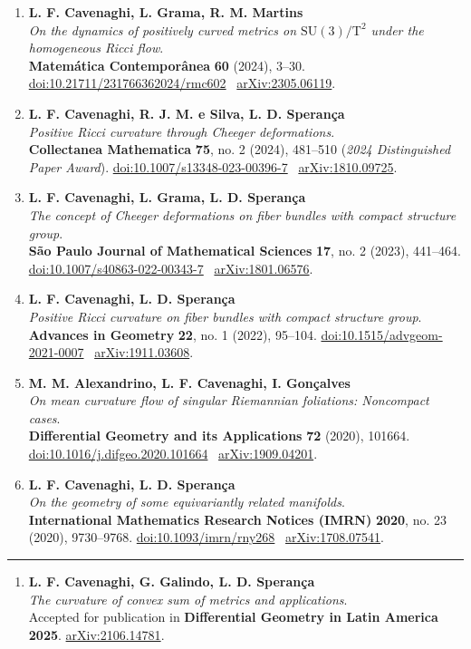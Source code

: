 \documentclass[10pt,a4paper]{article}
\newcommand{\sect}[1]{\vspace{10pt}{\large\bfseries\color{accent}#1}\par\vspace{2pt}\hrule\vspace{5pt}}
\newcommand{\paper}[3]{\Needspace{4\baselineskip}\item \textbf{#1}\\[-1pt]\emph{#2}.\\[-1pt]{\small #3}}
\begin{document}
\begin{enumerate}[leftmargin=2.0em,label=\textcolor{accent}{\arabic*.},labelsep=.65em,itemsep=5pt,topsep=4pt,parsep=0pt]
\paper{L. F. Cavenaghi, L. Grama, R. M. Martins}{On the dynamics of positively curved metrics on $\mathrm{SU}(3)/\mathrm{T}^2$ under the homogeneous Ricci flow}{\textbf{Matem\'atica Contempor\^anea} \textbf{60} (2024), 3--30. \href{https://doi.org/10.21711/231766362024/rmc602}{doi:10.21711/231766362024/rmc602} \textbar\ \href{https://arxiv.org/abs/2305.06119}{arXiv:2305.06119}.}
\paper{L. F. Cavenaghi, R. J. M. e Silva, L. D. Speran\c{c}a}{Positive Ricci curvature through Cheeger deformations}{\textbf{Collectanea Mathematica} \textbf{75}, no. 2 (2024), 481--510 (\emph{2024 Distinguished Paper Award}). \href{https://doi.org/10.1007/s13348-023-00396-7}{doi:10.1007/s13348-023-00396-7} \textbar\ \href{https://arxiv.org/abs/1810.09725}{arXiv:1810.09725}.}
\paper{L. F. Cavenaghi, L. Grama, L. D. Speran\c{c}a}{The concept of Cheeger deformations on fiber bundles with compact structure group}{\textbf{S\~ao Paulo Journal of Mathematical Sciences} \textbf{17}, no. 2 (2023), 441--464. \href{https://doi.org/10.1007/s40863-022-00343-7}{doi:10.1007/s40863-022-00343-7} \textbar\ \href{https://arxiv.org/abs/1801.06576}{arXiv:1801.06576}.}
\paper{L. F. Cavenaghi, L. D. Speran\c{c}a}{Positive Ricci curvature on fiber bundles with compact structure group}{\textbf{Advances in Geometry} \textbf{22}, no. 1 (2022), 95--104. \href{https://doi.org/10.1515/advgeom-2021-0007}{doi:10.1515/advgeom-2021-0007} \textbar\ \href{https://arxiv.org/abs/1911.03608}{arXiv:1911.03608}.}
\paper{M. M. Alexandrino, L. F. Cavenaghi, I. Gon\c{c}alves}{On mean curvature flow of singular Riemannian foliations: Noncompact cases}{\textbf{Differential Geometry and its Applications} \textbf{72} (2020), 101664. \href{https://doi.org/10.1016/j.difgeo.2020.101664}{doi:10.1016/j.difgeo.2020.101664} \textbar\ \href{https://arxiv.org/abs/1909.04201}{arXiv:1909.04201}.}
\paper{L. F. Cavenaghi, L. D. Speran\c{c}a}{On the geometry of some equivariantly related manifolds}{\textbf{International Mathematics Research Notices (IMRN)} \textbf{2020}, no. 23 (2020), 9730--9768. \href{https://doi.org/10.1093/imrn/rny268}{doi:10.1093/imrn/rny268} \textbar\ \href{https://arxiv.org/abs/1708.07541}{arXiv:1708.07541}.}
\end{enumerate}

\sect{Accepted Articles \& Contributions (1)}
\begin{enumerate}[leftmargin=2.0em,label=\textcolor{accent}{\arabic*.},labelsep=.65em,itemsep=5pt,topsep=4pt,parsep=0pt,start=14]
\paper{L. F. Cavenaghi, G. Galindo, L. D. Speran\c{c}a}{The curvature of convex sum of metrics and applications}{Accepted for publication in \textbf{Differential Geometry in Latin America 2025}. \href{https://arxiv.org/abs/2106.14781}{arXiv:2106.14781}.}
\end{enumerate}
\end{document}
